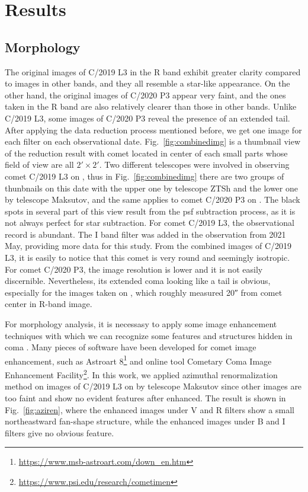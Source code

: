 \section{Results} \label{sec:res}

\subsection{Morphology}

The original images of C/2019 L3 in the R band exhibit greater clarity compared to images in other bands, and they all resemble a star-like appearance. On the other hand, the original images of C/2020 P3 appear very faint, and the ones taken in the R band are also relatively clearer than those in other bands. Unlike C/2019 L3, some images of C/2020 P3 reveal the presence of an extended tail. After applying the data reduction process mentioned before, we get one image for each filter on each observational date. Fig.~\ref{fig:combinedimg} is a thumbnail view of the reduction result with comet located in center of each small parts whose field of view are all $\ang{;2;} \times \ang{;2;}$. Two different telescopes were involved in observing comet C/2019 L3 on , thus in Fig.~\ref{fig:combinedimg} there are two groups of thunbnails on this date with the upper one by telescope ZTSh and the lower one by telescope Maksutov, and the same applies to comet C/2020 P3 on . The black spots in several part of this view result from the psf subtraction process, as it is not always perfect for star subtraction. For comet C/2019 L3, the observational record is abundant. The I band filter was added in the observation from 2021 May, providing more data for this study. From the combined images of C/2019 L3, it is easily to notice that this comet is very round and seemingly isotropic. For comet C/2020 P3, the image resolution is lower and it is not easily discernible. Nevertheless, its extended coma looking like a tail is obvious, especially for the images taken on , which roughly measured \ang{;;20} from comet center in R-band image. 

For morphology analysis, it is necessasy to apply some image enhancement techniques with which we can recognize some features and structures hidden in coma \citep{samarasinha_image_2014}. Many pieces of software have been developed for comet image enhancement, such as Astroart 8\footnote{\url{https://www.msb-astroart.com/down_en.htm}} and online tool Cometary Coma Image Enhancement Facility\footnote{\url{https://www.psi.edu/research/cometimen}}. In this work, 
we applied azimuthal renormalization method on images of C/2019 L3 on  by telescope Maksutov since other images are too faint and show no evident features after enhanced. The result is shown in Fig.~\ref{fig:aziren}, where the enhanced images under V and R filters show a small northeastward fan-shape structure, while the enhanced images under B and I filters give no obvious feature.  


